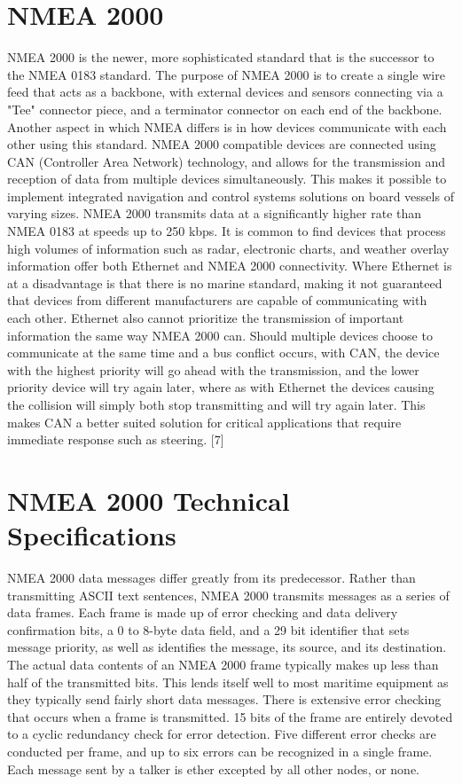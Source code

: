 \documentclass{report}
\begin{document}
\section{NMEA 2000}
NMEA 2000 is the newer, more sophisticated standard that is the successor to the NMEA 0183 standard. The purpose of NMEA 2000 is to create a single wire feed that acts as a backbone, with external devices and sensors connecting via a "Tee" connector piece, and a terminator connector on each end of the backbone. Another aspect in which NMEA differs is in how devices communicate with each other using this standard. NMEA 2000 compatible devices are connected using CAN (Controller Area Network) technology, and allows for the transmission and reception of data from multiple devices simultaneously. This makes it possible to implement integrated navigation and control systems solutions on board vessels of varying sizes. NMEA 2000 transmits data at a significantly higher rate than NMEA 0183 at speeds up to 250 kbps. It is common to find devices that process high volumes of information such as radar, electronic charts, and weather overlay information offer both Ethernet and NMEA 2000 connectivity. Where Ethernet is at a disadvantage is that there is no marine standard, making it not guaranteed that devices from different manufacturers are capable of communicating with each other. Ethernet also cannot prioritize the transmission of important information the same way NMEA 2000 can. Should multiple devices choose to communicate at the same time and a bus conflict occurs, with CAN, the device with the highest priority will go ahead with the transmission, and the lower priority device will try again later, where as with Ethernet the devices causing the collision will simply both stop transmitting and will try again later. This makes CAN a better suited solution for critical applications that require immediate response such as steering.
[7]   

\section{NMEA 2000 Technical Specifications}

NMEA 2000 data messages differ greatly from its predecessor. Rather than transmitting ASCII text sentences, NMEA 2000 transmits messages as a series of data frames. Each frame is made up of error checking and data delivery confirmation bits, a 0 to 8-byte data field, and a 29 bit identifier that sets message priority, as well as identifies the message, its source, and its destination. The actual data contents of an NMEA 2000 frame typically makes up less than half of the transmitted bits. This lends itself well to most maritime equipment as they typically send fairly short data messages. There is extensive error checking that occurs when a frame is transmitted. 15 bits of the frame are entirely devoted to a cyclic redundancy check for error detection. Five different error checks are conducted per frame, and up to six errors can be recognized in a single frame. Each message sent by a talker is ether excepted by all other nodes, or none. 
\end{document}
